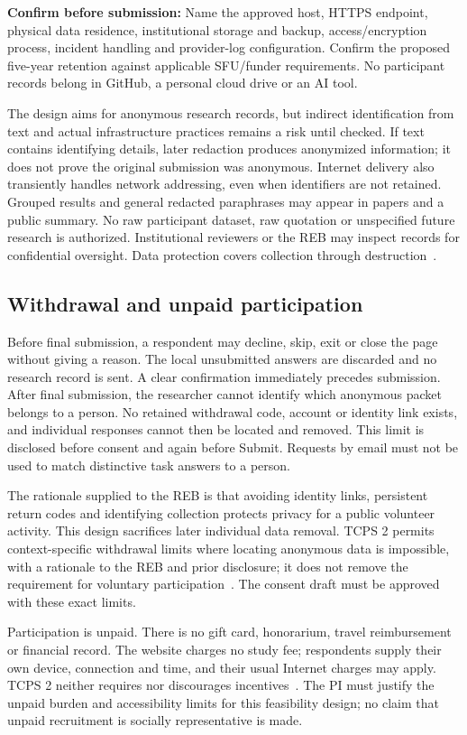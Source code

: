\documentclass[11pt,letterpaper]{article}
\newcommand{\pending}[1]{\textbf{Confirm before submission:} #1}
\begin{document}
\pending{Name the approved host, HTTPS endpoint, physical data residence, institutional storage and backup, access/encryption process, incident handling and provider-log configuration. Confirm the proposed five-year retention against applicable SFU/funder requirements. No participant records belong in GitHub, a personal cloud drive or an AI tool.}

The design aims for anonymous research records, but indirect identification from text and actual infrastructure practices remains a risk until checked. If text contains identifying details, later redaction produces anonymized information; it does not prove the original submission was anonymous. Internet delivery also transiently handles network addressing, even when identifiers are not retained. Grouped results and general redacted paraphrases may appear in papers and a public summary. No raw participant dataset, raw quotation or unspecified future research is authorized. Institutional reviewers or the REB may inspect records for confidential oversight. Data protection covers collection through destruction~\cite{sfu-guidance,tcps-privacy}.

\subsection{Withdrawal and unpaid participation}
Before final submission, a respondent may decline, skip, exit or close the page without giving a reason. The local unsubmitted answers are discarded and no research record is sent. A clear confirmation immediately precedes submission. After final submission, the researcher cannot identify which anonymous packet belongs to a person. No retained withdrawal code, account or identity link exists, and individual responses cannot then be located and removed. This limit is disclosed before consent and again before Submit. Requests by email must not be used to match distinctive task answers to a person.

The rationale supplied to the REB is that avoiding identity links, persistent return codes and identifying collection protects privacy for a public volunteer activity. This design sacrifices later individual data removal. TCPS 2 permits context-specific withdrawal limits where locating anonymous data is impossible, with a rationale to the REB and prior disclosure; it does not remove the requirement for voluntary participation~\cite{tcps-consent}. The consent draft must be approved with these exact limits.

Participation is unpaid. There is no gift card, honorarium, travel reimbursement or financial record. The website charges no study fee; respondents supply their own device, connection and time, and their usual Internet charges may apply. TCPS 2 neither requires nor discourages incentives~\cite{tcps-incentives}. The PI must justify the unpaid burden and accessibility limits for this feasibility design; no claim that unpaid recruitment is socially representative is made.
\end{document}
